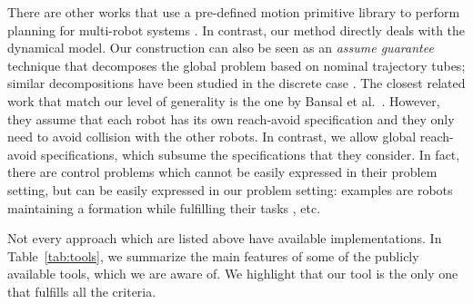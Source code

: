 \begin{enumerate}[(1)]
There are other works that use a pre-defined motion primitive library to perform planning for multi-robot 
systems \cite{saha2016implan,BanusicMPSZ19pgcd,Gavran2017antlab,desai2017drona}. 
In contrast, our method directly deals with the dynamical model. 
Our construction can also be seen as an \emph{assume guarantee} technique that decomposes the global problem based on nominal trajectory tubes; similar decompositions have been studied in the discrete case \cite{alur2015pattern,majumdarassume}.
The closest related work that match our level of generality is the one by Bansal et al.\ \cite{bansal2017safe}.
However, they assume that each robot has its own reach-avoid specification and they only need to avoid collision with the other robots.
In contrast, we allow global reach-avoid specifications, which subsume the specifications that they consider.
In fact, there are control problems which cannot be easily expressed in their problem setting, but can be easily expressed in our problem setting: 
examples are robots maintaining a formation while fulfilling their tasks \cite{alonso2019distributed}, etc.
\end{enumerate}

Not every approach which are listed above have available implementations.
In Table~\ref{tab:tools}, we summarize the main features of some of the publicly available tools, which we are aware of.
We highlight that our tool \tool is the only one that fulfills all the criteria.

